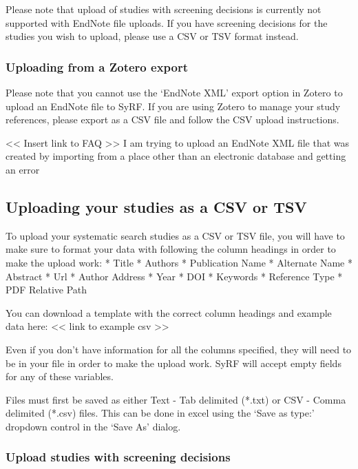 \documentclass[
]{book}
\begin{document}
Please note that upload of studies with screening decisions is currently not supported with EndNote file uploads. If you have screening decisions for the studies you wish to upload, please use a CSV or TSV format instead.

\hypertarget{uploading-from-a-zotero-export}{%
\subsubsection{Uploading from a Zotero export}\label{uploading-from-a-zotero-export}}

Please note that you cannot use the `EndNote XML' export option in Zotero to upload an EndNote file to SyRF. If you are using Zotero to manage your study references, please export as a CSV file and follow the CSV upload instructions.

\textless{}\textless{} Insert link to FAQ \textgreater{}\textgreater{}
I am trying to upload an EndNote XML file that was created by importing from a place other than an electronic database and getting an error

\hypertarget{uploading-your-studies-as-a-csv-or-tsv}{%
\subsection{Uploading your studies as a CSV or TSV}\label{uploading-your-studies-as-a-csv-or-tsv}}

To upload your systematic search studies as a CSV or TSV file, you will have to make sure to format your data with following the column headings in order to make the upload work:
* Title
* Authors
* Publication Name
* Alternate Name
* Abstract
* Url
* Author Address
* Year
* DOI
* Keywords
* Reference Type
* PDF Relative Path

You can download a template with the correct column headings and example data here:
\textless{}\textless{} link to example csv \textgreater{}\textgreater{}

Even if you don't have information for all the columns specified, they will need to be in your file in order to make the upload work. SyRF will accept empty fields for any of these
variables.

Files must first be saved as either Text - Tab delimited (*.txt) or CSV - Comma delimited (*.csv) files. This can be done in excel using the `Save as type:' dropdown control in the `Save As' dialog.

\hypertarget{upload-studies-with-screening-decisions}{%
\subsubsection{Upload studies with screening decisions}\label{upload-studies-with-screening-decisions}}
\end{document}

